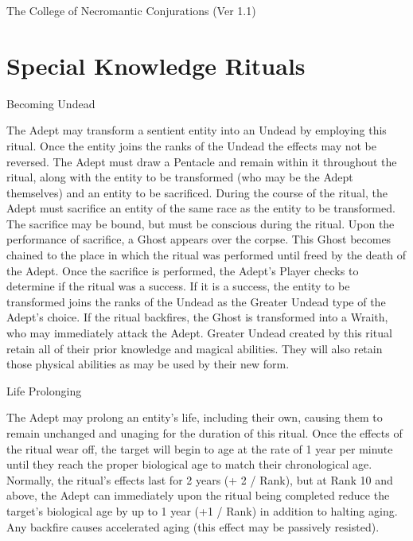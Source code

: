 \begin{Chapter}{The College of Necromantic Conjurations (Ver 1.1)}
\section{Special Knowledge Rituals}

\begin{ritual}[R-1]{Becoming Undead}

\begin{effects}
The Adept may transform a sentient entity into an Undead by employing
this ritual. Once the entity joins the ranks of the Undead the effects
may not be reversed.  The Adept must draw a Pentacle and remain within
it throughout the ritual, along with the entity to be transformed (who
may be the Adept themselves) and an entity to be sacrificed.  During
the course of the ritual, the Adept must sacrifice an entity of the
same race as the entity to be transformed.  The sacrifice may be
bound, but must be conscious during the ritual.  Upon the performance
of sacrifice, a Ghost appears over the corpse. This Ghost becomes
chained to the place in which the ritual was performed until freed by
the death of the Adept.  Once the sacrifice is performed, the Adept’s
Player checks to determine if the ritual was a success. If it is a
success, the entity to be transformed joins the ranks of the Undead as
the Greater Undead type of the Adept’s choice.  If the ritual
backfires, the Ghost is transformed into a Wraith, who may immediately
attack the Adept.  Greater Undead created by this ritual retain all of
their prior knowledge and magical abilities.  They will also retain
those physical abilities as may be used by their new form.
\end{effects}
\end{ritual}

\begin{ritual}[R-2]{Life Prolonging}

\begin{effects}
The Adept may prolong an entity’s life, including their own, causing
them to remain unchanged and unaging for the duration of this ritual.
Once the effects of the ritual wear off, the target will begin to age
at the rate of 1 year per minute until they reach the proper
biological age to match their chronological age.  Normally, the
ritual’s effects last for 2 years (+ 2 / Rank), but at Rank 10 and
above, the Adept can immediately upon the ritual being completed
reduce the target’s biological age by up to 1 year (+1 / Rank) in
addition to halting aging.  Any backfire causes accelerated aging
(this effect may be passively resisted).
\end{effects}
\end{ritual}


\end{Chapter}
